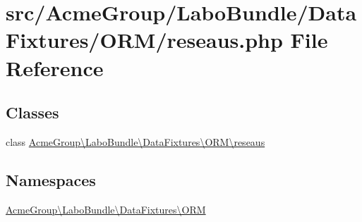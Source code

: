 \hypertarget{reseaus_8php}{\section{src/\+Acme\+Group/\+Labo\+Bundle/\+Data\+Fixtures/\+O\+R\+M/reseaus.php File Reference}
\label{reseaus_8php}
}
\subsection*{Classes}
\begin{DoxyCompactItemize}
\item 
class \hyperlink{class_acme_group_1_1_labo_bundle_1_1_data_fixtures_1_1_o_r_m_1_1reseaus}{Acme\+Group\textbackslash{}\+Labo\+Bundle\textbackslash{}\+Data\+Fixtures\textbackslash{}\+O\+R\+M\textbackslash{}reseaus}
\end{DoxyCompactItemize}
\subsection*{Namespaces}
\begin{DoxyCompactItemize}
\item 
 \hyperlink{namespace_acme_group_1_1_labo_bundle_1_1_data_fixtures_1_1_o_r_m}{Acme\+Group\textbackslash{}\+Labo\+Bundle\textbackslash{}\+Data\+Fixtures\textbackslash{}\+O\+R\+M}
\end{DoxyCompactItemize}
